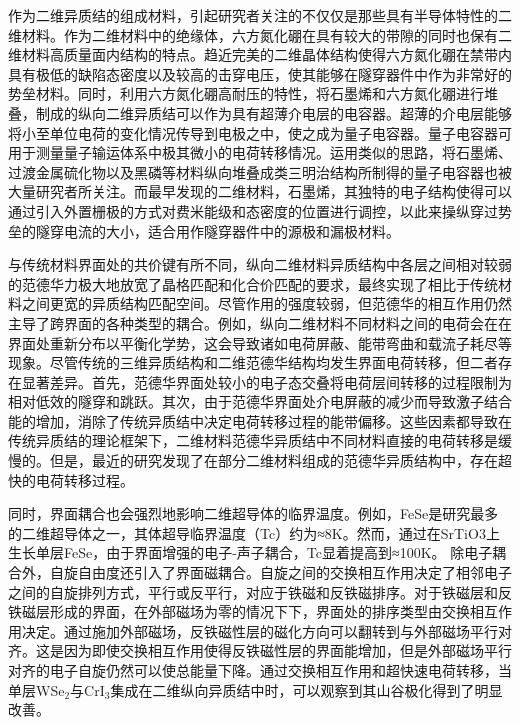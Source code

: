     作为二维异质结的组成材料，引起研究者关注的不仅仅是那些具有半导体特性的二维材料。作为二维材料中的绝缘体，六方氮化硼在具有较大的带隙的同时也保有二维材料高质量面内结构的特点。趋近完美的二维晶体结构使得六方氮化硼在禁带内具有极低的缺陷态密度以及较高的击穿电压，使其能够在隧穿器件中作为非常好的势垒材料。同时，利用六方氮化硼高耐压的特性，将石墨烯和六方氮化硼进行堆叠，制成的纵向二维异质结可以作为具有超薄介电层的电容器。超薄的介电层能够将小至单位电荷的变化情况传导到电极之中，使之成为量子电容器。量子电容器可用于测量量子输运体系中极其微小的电荷转移情况。运用类似的思路，将石墨烯、过渡金属硫化物以及黑磷等材料纵向堆叠成类三明治结构所制得的量子电容器也被大量研究者所关注。而最早发现的二维材料，石墨烯，其独特的电子结构使得可以通过引入外置栅极的方式对费米能级和态密度的位置进行调控，以此来操纵穿过势垒的隧穿电流的大小，适合用作隧穿器件中的源极和漏极材料。

    与传统材料界面处的共价键有所不同，纵向二维材料异质结构中各层之间相对较弱的范德华力极大地放宽了晶格匹配和化合价匹配的要求，最终实现了相比于传统材料之间更宽的异质结构匹配空间。尽管作用的强度较弱，但范德华的相互作用仍然主导了跨界面的各种类型的耦合。例如，纵向二维材料不同材料之间的电荷会在在界面处重新分布以平衡化学势，这会导致诸如电荷屏蔽、能带弯曲和载流子耗尽等现象。尽管传统的三维异质结构和二维范德华结构均发生界面电荷转移，但二者存在显著差异。首先，范德华界面处较小的电子态交叠将电荷层间转移的过程限制为相对低效的隧穿和跳跃。其次，由于范德华界面处介电屏蔽的减少而导致激子结合能的增加，消除了传统异质结中决定电荷转移过程的能带偏移。这些因素都导致在传统异质结的理论框架下，二维材料范德华异质结中不同材料直接的电荷转移是缓慢的。但是，最近的研究发现了在部分二维材料组成的范德华异质结构中，存在超快的电荷转移过程。%

    同时，界面耦合也会强烈地影响二维超导体的临界温度。例如，FeSe是研究最多的二维超导体之一，其体超导临界温度（Tc）约为≈8K。然而，通过在SrTiO3上生长单层FeSe，由于界面增强的电子-声子耦合，Tc显着提高到≈100K。%
    除电子耦合外，自旋自由度还引入了界面磁耦合。自旋之间的交换相互作用决定了相邻电子之间的自旋排列方式，平行或反平行，对应于铁磁和反铁磁排序。对于铁磁层和反铁磁层形成的界面，在外部磁场为零的情况下下，界面处的排序类型由交换相互作用决定。通过施加外部磁场，反铁磁性层的磁化方向可以翻转到与外部磁场平行对齐。这是因为即使交换相互作用使得反铁磁性层的界面能增加，但是外部磁场平行对齐的电子自旋仍然可以使总能量下降。通过交换相互作用和超快速电荷转移，当单层WSe$_2$与CrI$_3$集成在二维纵向异质结中时，可以观察到其山谷极化得到了明显改善。%

